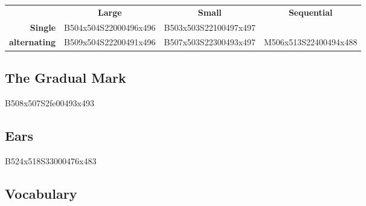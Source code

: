 \documentclass{article}
\begin{document}
\begin{center}
\begin{tabular}{r*{3}{c}}
&\textbf{Large}&\textbf{Small}&\textbf{Sequential}\\
\textbf{Single}     &B504x504S22000496x496&B503x503S22100497x497\\
\textbf{alternating}&B509x504S22200491x496&B507x503S22300493x497&M506x513S22400494x488\\
\end{tabular}
\end{center}

\subsection{The Gradual Mark}

\begin{center}
B508x507S2fe00493x493
\end{center}

\subsection{Ears}

\begin{center}
B524x518S33000476x483
\end{center}

\subsection{Vocabulary}
\end{document}
